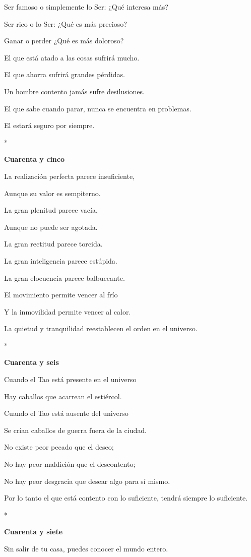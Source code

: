 Ser famoso o simplemente lo Ser: ¿Qué interesa más?

Ser rico o lo Ser: ¿Qué es más precioso?

Ganar o perder ¿Qué es más doloroso?

El que está atado a las cosas sufrirá mucho.

El que ahorra sufrirá grandes pérdidas.

Un hombre contento jamás sufre desilusiones.

El que sabe cuando parar, nunca se encuentra en problemas.

El estará seguro por siempre.

*

\textbf{Cuarenta y cinco}

La realización perfecta parece insuficiente,

Aunque su valor es sempiterno.

La gran plenitud parece vacía,

Aunque no puede ser agotada.

La gran rectitud parece torcida.

La gran inteligencia parece estúpida.

La gran elocuencia parece balbuceante.

El movimiento permite vencer al frío

Y la inmovilidad permite vencer al calor.

La quietud y tranquilidad reestablecen el orden en el universo.

*

\textbf{Cuarenta y seis}

Cuando el Tao está presente en el universo

Hay caballos que acarrean el estiércol.

Cuando el Tao está ausente del universo

Se crían caballos de guerra fuera de la ciudad.

No existe peor pecado que el deseo;

No hay peor maldición que el descontento;

No hay peor desgracia que desear algo para sí mismo.

Por lo tanto el que está contento con lo suficiente, tendrá siempre lo
suficiente.

*

\textbf{Cuarenta y siete}

Sin salir de tu casa, puedes conocer el mundo entero.

